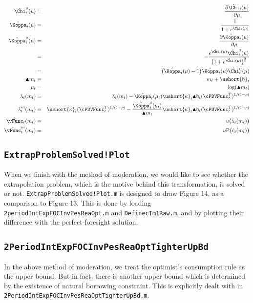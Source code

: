 \documentclass[titlepage,abstract]{\econtex}
\providecommand{\vInv}{\ensuremath{\scriptstyle \Lambda \displaystyle}}
\begin{document}
\begin{itemize}
\begin{eqnarray}
            \hat{\Chi}^{\mu}_{t}(\mu) &=& \frac{\partial \hat{\Chi}_{t}(\mu)}{\partial \mu} \\
            \hat{\Koppa}_{t} (\mu) &=& \frac{1}{1+e^{\hat{\Chi}_{t}(\mu)}} \\
            \hat{\Koppa}^{\mu}_{t} (\mu) &=& \frac{\partial \hat{\Koppa}_{t} (\mu)}{\partial \mu} \\
            &=& -\frac{e^{\hat{\Chi}_{t}(\mu)} \hat{\Chi}^{\mu}_{t}(\mu)}{\big(1+e^{\hat{\Chi}_{t}(\mu)}\big)^{2}} \\
            &=& \big(\hat{\Koppa}_{t} (\mu)-1\big)\hat{\Koppa}_{t} (\mu) \hat{\Chi}^{\mu}_{t}(\mu) \\
            \blacktriangle m_{t} &=& m_{t} + \ushort{\mathfrak{h}}_{t} \\
            \mu_{t} &=& \log(\blacktriangle m_{t}) \\
            \hat{\vInv}_{t} (m_{t}) &=& \bar{\vInv}_{t}(m_{t})-\hat{\Koppa}_{t} (\mu_{t}) \ushort{\kappa}_{t} \blacktriangle \mathfrak{h}_{t} (\cPDVFunc_{t}^{T})^{1/(1-\rho)} \\
            \hat{\vInv}_{t}^{m} (m_{t}) &=& \ushort{\kappa}_{t} (\cPDVFunc_{t}^{T})^{1/(1-\rho)}-\frac{\hat{\Koppa}_{t}^{\mu}(\mu_{t})}{\blacktriangle m_{t}} \ushort{\kappa}_{t} \blacktriangle \mathfrak{h}_{t} (\cPDVFunc_{t}^{T})^{1/(1-\rho)} \\
            \hat{\vFunc}_{t} (m_{t}) &=& u\big(\hat{\vInv}_{t}(m_{t})\big) \\
            \hat{\vFunc}_{t}^{m} (m_{t}) &=& u\text{P}\big(\hat{c}_{t}(m_{t})\big)
            \end{eqnarray}
\end{itemize}

\subsection{\texttt{ExtrapProblemSolved!Plot}}

When we finish with the method of moderation, we would like to see whether the extrapolation problem, which is the motive behind this transformation, is solved or not. \texttt{ExtrapProblemSolved!Plot.m} is designed to draw Figure 14, as a comparison to Figure 13. This is done by loading \texttt{2periodIntExpFOCInvPesReaOpt.m} and \texttt{DefinecTm1Raw.m}, and by plotting their difference with the perfect-foresight solution.

\subsection{\texttt{2PeriodIntExpFOCInvPesReaOptTighterUpBd}}
In the above method of moderation, we treat the optimist's consumption rule as the upper bound. But in fact, there is another upper bound which is determined by the existence of natural borrowing constraint. This is explicitly dealt with in \texttt{2PeriodIntExpFOCInvPesReaOptTighterUpBd.m}.
\end{document}
